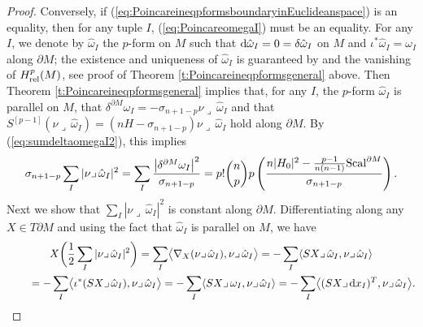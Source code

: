 \documentclass[pdftex]{sigma}
\numberwithin{equation}{section}
\begin{document}
\begin{proof}
Conversely, if (\ref{eq:PoincareineqpformsboundaryinEuclideanspace}) is an equality, then for any tuple $I$, (\ref{eq:PoincareomegaI}) must be an equality.
For any $I$, we denote by $\hat{\omega}_I$ the $p$-form on $M$ such that ${\rm d}\hat{\omega}_I=0=\delta\hat{\omega}_I$ on $M$ and $\iota^*\hat{\omega}_I=\omega_I$ along $\partial M$; the existence and uniqueness of $\hat{\omega}_I$ is guaranteed by \cite[Theorem 2]{DuffSpencer52} and the vanishing of  $H_{\rm rel}^p(M)$,  see proof of Theorem \ref{t:Poincareineqpformsgeneral} above. Then Theorem \ref{t:Poincareineqpformsgeneral} implies that, for any $I$, the $p$-form $\hat{\omega}_I$ is parallel on $M$, that $\delta^{\partial M}\omega_I=-\sigma_{n+1-p}\nu\lrcorner\,\hat{\omega}_I$ and that $S^{[p-1]}(\nu\lrcorner\,\hat{\omega}_I)=(nH-\sigma_{n+1-p})\nu\lrcorner\,\hat{\omega}_I$ hold along $\partial M$. By (\ref{eq:sumdeltaomegaI2}), this implies
\begin{gather}\label{eq:sumdeltaomegaI2bis}
\sigma_{n+1-p}\sum_I|\nu\lrcorner\,\hat{\omega}_I|^2=\sum_I\frac{\bigl|\delta^{\partial M}\omega_I\bigr|^2}{\sigma_{n+1-p}}
=p!\binom{n}{p}p\left(\frac{n|H_0|^2-\frac{p-1}{n(n-1)}{\rm Scal}^{\partial M}}{\sigma_{n+1-p}}\right).
\end{gather}
Next we show that $\sum_I|\nu\lrcorner\,\hat{\omega}_I|^2$ is constant along $\partial M$. Differentiating along any $X\in T\partial M$ and using the fact that $\hat{\omega}_I$ is parallel on $M$, we have
\begin{gather*}
X\biggl(\frac{1}{2}\sum_I|\nu\lrcorner\,\hat{\omega}_I|^2\biggr)
=\sum_I\bigl\langle\nabla_X(\nu\lrcorner\,\hat{\omega}_I),\nu\lrcorner\,\hat{\omega}_I\bigr\rangle
=-\sum_I\langle SX\lrcorner\,\hat{\omega}_I,\nu\lrcorner\,\hat{\omega}_I\rangle\\
\qquad{}=-\sum_I\bigl\langle \iota^*(SX\lrcorner\,\hat{\omega}_I),\nu\lrcorner\,\hat{\omega}_I\bigr\rangle
=-\sum_I\langle SX\lrcorner\,\omega_I,\nu\lrcorner\,\hat{\omega}_I\rangle
=-\sum_I\bigl\langle (SX\lrcorner\,{\rm d}x_I)^T,\nu\lrcorner\,\hat{\omega}_I\bigr\rangle.
\end{gather*}


\end{proof}
\end{document}

